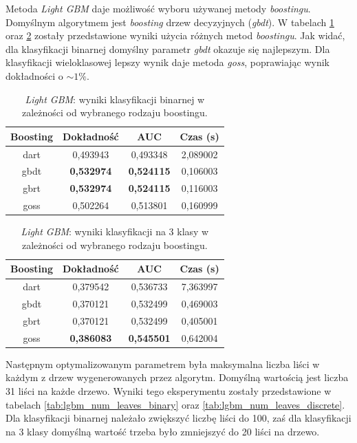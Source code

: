 \documentclass[a4paper, twoside, 11pt, openright]{article}
\begin{document}
Metoda \textit{Light GBM} daje możliwość wyboru używanej metody \textit{boostingu}. Domyślnym algorytmem jest \textit{boosting} drzew decyzyjnych (\textit{gbdt}). W tabelach \ref{tab:lgbm_boosting_binary} oraz \ref{tab:lgbm_boosting_discrete} zostały przedstawione wyniki użycia różnych metod \textit{boostingu}. Jak widać, dla klasyfikacji binarnej domyślny parametr \textit{gbdt} okazuje się najlepszym. Dla klasyfikacji wieloklasowej lepszy wynik daje metoda \textit{goss}, poprawiając wynik dokładności o $\sim 1\%$.

\begin{table}[H]
    \centering
    \begin{tabular}{|c|c|c|c|}
    \hline
        \textbf{Boosting} & \textbf{Dokładność} & \textbf{AUC} & \textbf{Czas (s)} \\ \hline
dart     &  0,493943 &  0,493348 &    2,089002 \\ \hline
gbdt     &  \textbf{0,532974} &  \textbf{0,524115} &    0,106003 \\ \hline
gbrt     &  \textbf{0,532974} &  \textbf{0,524115} &    0,116003 \\ \hline
goss     &  0,502264 &  0,513801 &    0,160999 \\ \hline
    \end{tabular}
    \caption{\textit{Light GBM}: wyniki klasyfikacji binarnej w zależności od wybranego rodzaju boostingu.}
    \label{tab:lgbm_boosting_binary}
\end{table}

\begin{table}[H]
    \centering
    \begin{tabular}{|c|c|c|c|}
    \hline
        \textbf{Boosting} & \textbf{Dokładność} & \textbf{AUC} & \textbf{Czas (s)} \\ \hline
dart     &  0,379542 &  0,536733 &    7,363997 \\ \hline
gbdt     &  0,370121 &  0,532499 &    0,469003 \\ \hline
gbrt     &  0,370121 &  0,532499 &    0,405001 \\ \hline
goss     &  \textbf{0,386083} &  \textbf{0,545501} &    0,642004 \\ \hline
    \end{tabular}
    \caption{\textit{Light GBM}: wyniki klasyfikacji na 3 klasy w zależności od wybranego rodzaju boostingu.}
    \label{tab:lgbm_boosting_discrete}
\end{table}

Następnym optymalizowanym parametrem była maksymalna liczba liści w każdym z drzew wygenerowanych przez algorytm. Domyślną wartością jest liczba 31 liści na każde drzewo. Wyniki tego eksperymentu zostały przedstawione w tabelach \ref{tab:lgbm_num_leaves_binary} oraz \ref{tab:lgbm_num_leaves_discrete}. Dla klasyfikacji binarnej należało zwiększyć liczbę liści do 100, zaś dla klasyfikacji na 3 klasy domyślną wartość trzeba było zmniejszyć do 20 liści na drzewo. 
\end{document}
